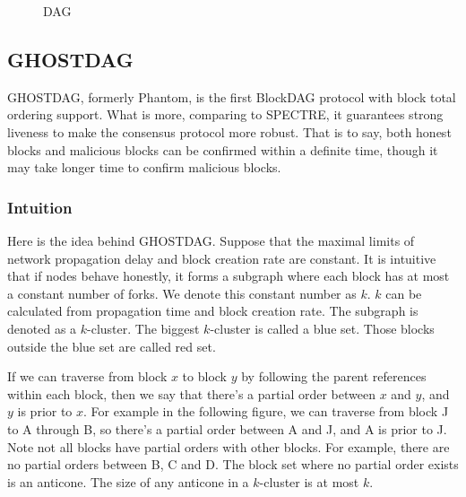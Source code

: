 \documentclass[a4paper,11pt]{article}
\begin{document}
\begin{figure}[hbt]
	\centerline{%
	}
\caption{DAG}
\end{figure}

\subsection{GHOSTDAG}

GHOSTDAG, formerly Phantom, is the first BlockDAG protocol with block total ordering support. What is more, comparing to SPECTRE, it guarantees strong liveness to make the consensus protocol more robust. That is to say, both honest blocks and malicious blocks can be confirmed within a definite time, though it may take longer time to confirm malicious blocks.


\subsubsection{Intuition}

Here is the idea behind GHOSTDAG. Suppose that the maximal limits of network propagation delay and block creation
rate are constant. It is intuitive that if nodes behave honestly, it forms a subgraph where each block has at most a constant number of forks. We denote
this constant number as $k$. $k$ can be calculated from propagation time and
block creation rate. The subgraph is denoted as a $k$-cluster. The biggest
$k$-cluster is called a blue set. Those blocks outside the blue set are called
red set.

If we can traverse from block $x$ to block $y$ by following the parent
references within each block, then we say that there's a partial order between
$x$ and $y$, and $y$ is prior to $x$. For example in the following figure, we
can traverse from block J to A through B, so there's a partial order between A
and J, and A is prior to J. Note not all blocks have partial orders with other
blocks. For example, there are no partial orders between B, C and D.  The block set where no partial order exists is an anticone. The size of any anticone in
a $k$-cluster is at most $k$.
\end{document}
